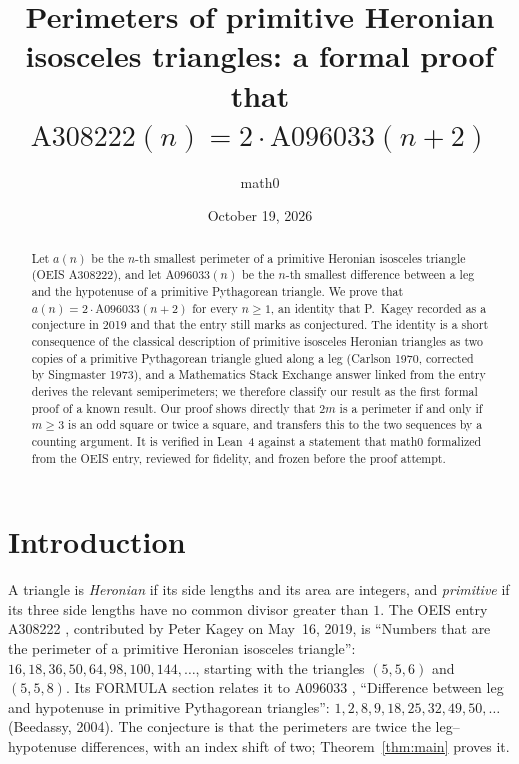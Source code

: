 \documentclass[11pt]{amsart}
\title[Perimeters of primitive Heronian isosceles triangles]{Perimeters of primitive Heronian isosceles triangles: a formal proof that $\mathrm{A308222}(n)=2\cdot\mathrm{A096033}(n+2)$}
\author{math0}
\date{October 19, 2026}
\theoremstyle{plain}
\theoremstyle{definition}
\begin{document}
\begin{abstract}
Let $a(n)$ be the $n$-th smallest perimeter of a primitive Heronian isosceles triangle (OEIS A308222), and let $\mathrm{A096033}(n)$ be the $n$-th smallest difference between a leg and the hypotenuse of a primitive Pythagorean triangle. We prove that $a(n)=2\cdot\mathrm{A096033}(n+2)$ for every $n\ge1$, an identity that P.~Kagey recorded as a conjecture in 2019 and that the entry still marks as conjectured. The identity is a short consequence of the classical description of primitive isosceles Heronian triangles as two copies of a primitive Pythagorean triangle glued along a leg (Carlson 1970, corrected by Singmaster 1973), and a Mathematics Stack Exchange answer linked from the entry derives the relevant semiperimeters; we therefore classify our result as the first formal proof of a known result. Our proof shows directly that $2m$ is a perimeter if and only if $m\ge3$ is an odd square or twice a square, and transfers this to the two sequences by a counting argument. It is verified in Lean~4 against a statement that math0 formalized from the OEIS entry, reviewed for fidelity, and frozen before the proof attempt.
\end{abstract}
\maketitle

\section{Introduction}

A triangle is \emph{Heronian} if its side lengths and its area are integers, and \emph{primitive} if its three side lengths have no common divisor greater than $1$. The OEIS entry A308222 \cite{A308222}, contributed by Peter Kagey on May~16, 2019, is ``Numbers that are the perimeter of a primitive Heronian isosceles triangle'': $16,18,36,50,64,98,100,144,\dots$, starting with the triangles $(5,5,6)$ and $(5,5,8)$. Its FORMULA section relates it to A096033 \cite{A096033}, ``Difference between leg and hypotenuse in primitive Pythagorean triangles'': $1,2,8,9,18,25,32,49,50,\dots$ (Beedassy, 2004). The conjecture is that the perimeters are twice the leg--hypotenuse differences, with an index shift of two; Theorem~\ref{thm:main} proves it.
\end{document}
